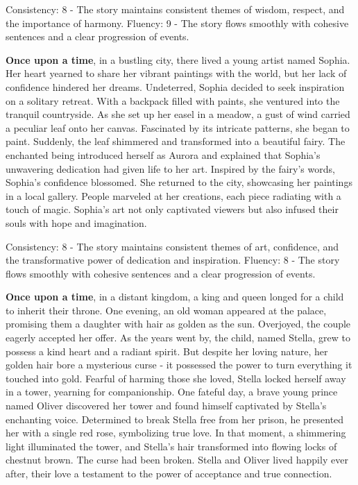\documentclass{article}
\begin{document}
Consistency: 8 - The story maintains consistent themes of wisdom, respect, and the importance of harmony.
Fluency: 9 - The story flows smoothly with cohesive sentences and a clear progression of events.

\textbf{Once upon a time}, in a bustling city, there lived a young artist named Sophia. Her heart yearned to share her vibrant paintings with the world, but her lack of confidence hindered her dreams. Undeterred, Sophia decided to seek inspiration on a solitary retreat. With a backpack filled with paints, she ventured into the tranquil countryside. As she set up her easel in a meadow, a gust of wind carried a peculiar leaf onto her canvas. Fascinated by its intricate patterns, she began to paint. Suddenly, the leaf shimmered and transformed into a beautiful fairy. The enchanted being introduced herself as Aurora and explained that Sophia's unwavering dedication had given life to her art. Inspired by the fairy's words, Sophia's confidence blossomed. She returned to the city, showcasing her paintings in a local gallery. People marveled at her creations, each piece radiating with a touch of magic. Sophia's art not only captivated viewers but also infused their souls with hope and imagination.

Consistency: 8 - The story maintains consistent themes of art, confidence, and the transformative power of dedication and inspiration.
Fluency: 8 - The story flows smoothly with cohesive sentences and a clear progression of events.

\textbf{Once upon a time}, in a distant kingdom, a king and queen longed for a child to inherit their throne. One evening, an old woman appeared at the palace, promising them a daughter with hair as golden as the sun. Overjoyed, the couple eagerly accepted her offer. As the years went by, the child, named Stella, grew to possess a kind heart and a radiant spirit. But despite her loving nature, her golden hair bore a mysterious curse - it possessed the power to turn everything it touched into gold. Fearful of harming those she loved, Stella locked herself away in a tower, yearning for companionship. One fateful day, a brave young prince named Oliver discovered her tower and found himself captivated by Stella's enchanting voice. Determined to break Stella free from her prison, he presented her with a single red rose, symbolizing true love. In that moment, a shimmering light illuminated the tower, and Stella's hair transformed into flowing locks of chestnut brown. The curse had been broken. Stella and Oliver lived happily ever after, their love a testament to the power of acceptance and true connection.
\end{document}
